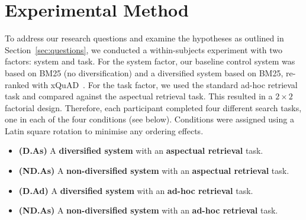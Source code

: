 \section{Experimental Method} \label{sec:method}
To address our research questions and examine the hypotheses as outlined in Section~\ref{sec:questions}, we conducted a within-subjects experiment with two factors: system and task. For the system factor, our baseline control system was based on BM25 (no diversification) and a diversified system based on BM25, re-ranked with xQuAD~\cite{santos2010query_reformulations_diversification}. For the task factor, we used the standard ad-hoc retrieval task and compared against the aspectual retrieval task. This resulted in a $2 \times 2$ factorial design. Therefore, each participant completed four different search tasks, one in each of the four conditions (see below). Conditions were assigned using a Latin square rotation to minimise any ordering effects.


\begin{itemize}
\item \textbf{(D.As)} A \textbf{diversified system} with an \textbf{aspectual retrieval} task.
\item \textbf{(ND.As)} A \textbf{non-diversified system} with an \textbf{aspectual retrieval} task.
\item \textbf{(D.Ad)} A \textbf{diversified system} with an \textbf{ad-hoc retrieval} task. 
\item \textbf{(ND.As)} A \textbf{non-diversified system} with an \textbf{ad-hoc retrieval} task.
\end{itemize}


